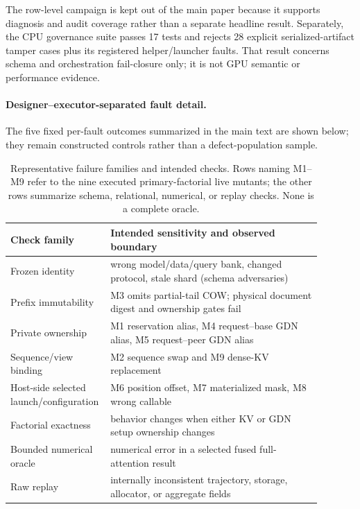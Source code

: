 \documentclass{article}
\begin{document}
The row-level campaign is kept out of the main paper because it supports
diagnosis and audit coverage rather than a separate headline result.
Separately, the CPU governance suite passes 17 tests and rejects 28 explicit
serialized-artifact tamper cases plus its registered helper/launcher faults.
That result concerns schema and orchestration fail-closure only; it is not GPU
semantic or performance evidence.




\paragraph{Designer--executor-separated fault detail.}
The five fixed per-fault outcomes summarized in the main text are shown below;
they remain constructed controls rather than a defect-population sample.


\begin{table}[H]
\caption{Representative failure families and intended checks.  Rows naming
M1--M9 refer to the nine executed primary-factorial live mutants; the other
rows summarize schema, relational, numerical, or replay checks.  None is a
complete oracle.}
\centering\small
\begin{tabular}{@{}p{0.23\linewidth}p{0.66\linewidth}@{}}
\toprule
Check family & Intended sensitivity and observed boundary \\
\midrule
Frozen identity & wrong model/data/query bank, changed protocol, stale shard (schema adversaries)\\
Prefix immutability & M3 omits partial-tail COW; physical document digest and ownership gates fail\\
Private ownership & M1 reservation alias, M4 request--base GDN alias, M5 request--peer GDN alias\\
Sequence/view binding & M2 sequence swap and M9 dense-KV replacement\\
Host-side selected launch/configuration & M6 position offset, M7 materialized mask, M8 wrong callable\\
Factorial exactness & behavior changes when either KV or GDN setup ownership changes\\
Bounded numerical oracle & numerical error in a selected fused full-attention result\\
Raw replay & internally inconsistent trajectory, storage, allocator, or aggregate fields\\
\bottomrule
\end{tabular}
\end{table}
\end{document}
